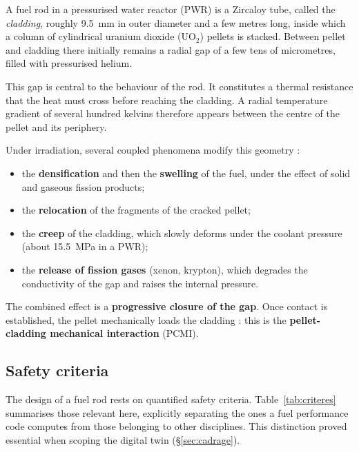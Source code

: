 A fuel rod in a pressurised water reactor (PWR) is a Zircaloy tube, called the
\textit{cladding}, roughly \SI{9.5}{\milli\metre} in outer diameter and a few
metres long, inside which a column of cylindrical uranium dioxide
($\mathrm{UO_2}$) pellets is stacked. Between pellet and cladding there
initially remains a radial gap of a few tens of micrometres, filled with
pressurised helium.

This gap is central to the behaviour of the rod. It constitutes a thermal
resistance that the heat must cross before reaching the cladding. A radial
temperature gradient of several hundred kelvins therefore appears between the
centre of the pellet and its periphery.

Under irradiation, several coupled phenomena modify this geometry :
\begin{itemize}
  \item the \textbf{densification} and then the \textbf{swelling} of the fuel,
    under the effect of solid and gaseous fission products;
  \item the \textbf{relocation} of the fragments of the cracked pellet;
  \item the \textbf{creep} of the cladding, which slowly deforms under the
    coolant pressure (about \SI{15.5}{\mega\pascal} in a PWR);
  \item the \textbf{release of fission gases} (xenon, krypton), which degrades
    the conductivity of the gap and raises the internal pressure.
\end{itemize}

The combined effect is a \textbf{progressive closure of the gap}. Once contact
is established, the pellet mechanically loads the cladding : this is the
\textbf{pellet-cladding mechanical interaction} (PCMI).

\subsection{Safety criteria}

The design of a fuel rod rests on quantified safety criteria.
Table~\ref{tab:criteres} summarises those relevant here, explicitly separating
the ones a fuel performance code computes from those belonging to other
disciplines. This distinction proved essential when scoping the digital twin
(§\ref{sec:cadrage}).

